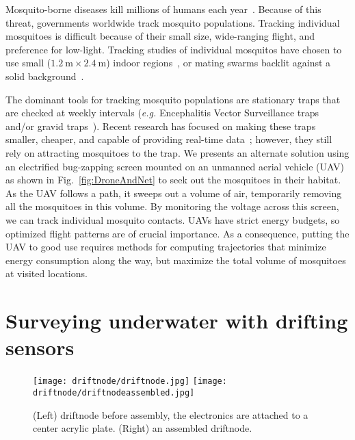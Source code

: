 Mosquito-borne diseases kill millions of humans each year~\cite{murray2012global}. 
Because of this threat, governments worldwide track mosquito populations.
Tracking individual mosquitoes is difficult because of their small size, wide-ranging flight, and preference for low-light.
Tracking studies of individual mosquitos have chosen to use small ($\SI{1.2}{\metre} \times \SI{2.4}{\metre}$) indoor regions~\cite{parker2015infrared}, or mating swarms backlit against a solid background~\cite{butail20113d}.

The dominant tools for tracking mosquito populations are stationary traps that are checked at weekly intervals (\textit{e.g.} Encephalitis Vector Surveillance traps and/or gravid traps~\cite{williams2007comparison}). 
Recent research has focused on making these traps smaller, cheaper, and capable of providing real-time data~\cite{chen2014flying,linn2016building}; however, they still rely on attracting mosquitoes to the trap. 
We presents an alternate solution using an electrified bug-zapping screen mounted on an unmanned aerial vehicle (UAV) as shown in Fig.~\ref{fig:DroneAndNet} to seek out the mosquitoes in their habitat.
As the UAV follows a path, it sweeps out a volume of air, temporarily removing all the mosquitoes in this volume.
By monitoring the voltage across this screen, we can track individual mosquito contacts.
UAVs have strict energy budgets, so optimized flight patterns are of crucial importance.
As a consequence, putting the UAV to good use requires methods for computing trajectories that minimize energy consumption along the way, but maximize the total volume of mosquitoes at visited locations.

\section[Drifting sensors]{Surveying underwater with drifting sensors}

\begin{figure}[h]
	\begin{center}
	\texttt{[image: driftnode/driftnode.jpg]}
	\texttt{[image: driftnode/driftnodeassembled.jpg]}
	\caption[Driftnode]{
		(Left) driftnode before assembly, the electronics are attached to a center acrylic plate.
		(Right) an assembled driftnode.
	} \label{fig:driftnodeoverview}
	\end{center}
	\vspace{-1em}
\end{figure}


